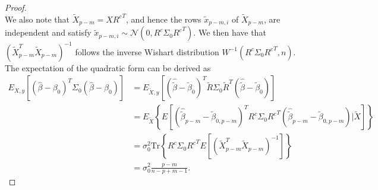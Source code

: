 \begin{proof}
\begin{equation*}
\end{equation*}
We also note that $\tilde{X}_{p-m} = X {R^c}^T$, and hence the rows $\tilde{x}_{p-m, i}$ of $\tilde{X}_{p-m}$, are independent and satisfy $\tilde{x}_{p-m, i} \sim \mathcal{N} \left( 0, R^c \Sigma_0 {R^c}^T \right)$. We then have that $\left( \tilde{X}_{p-m}^T \tilde{X}_{p-m} \right)^{-1}$ follows the inverse Wishart distribution $W^{-1}( R^c \Sigma_0 {R^c}^T, n)$. The expectation of the quadratic form can be derived as
\begin{equation*}
\begin{aligned}
E_{X,y}  \left [ (\hat \beta-\beta_0)^T \Sigma_0 (\hat \beta-\beta_0) \right ] 
&=  E_{\tilde{X},y}  \left [ \left( \hat{\tilde{\beta}} - \tilde{\beta}_0 \right)^T \tilde{R} \Sigma_0 \tilde{R}^T \left( \hat{\tilde{\beta}} - \tilde{\beta}_0 \right) \right ]\\
&=  E_{\tilde{X}} \left\{ E  \left [ \left( \hat{\tilde{\beta}}_{p-m} - \tilde{\beta}_{0,p-m} \right)^T R^c \Sigma_0 {R^c}^T \left(\hat{\tilde{\beta}}_{p-m} - \tilde{\beta}_{0,p-m} \right) \Big| \tilde{X} \right ]  \right\}\\
&= \sigma_0^2 \text{Tr} \left\{ R^c \Sigma_0 {R^c}^T E \left[ \left( \tilde{X}_{p-m}^T \tilde{X}_{p-m} \right)^{-1} \right] \right\} \\
&= \sigma_0^2 \frac{p-m}{n-p+m-1}.
\end{aligned}
\end{equation*}

\end{proof}


